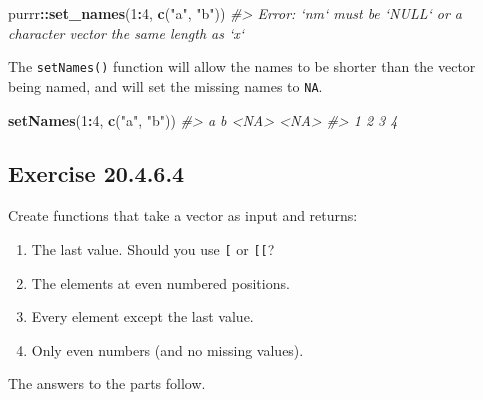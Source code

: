 \documentclass[]{book}
\newenvironment{Shaded}{\begin{snugshade}}{\end{snugshade}}
\newcommand{\CommentTok}[1]{\textcolor[rgb]{0.56,0.35,0.01}{\textit{#1}}}
\newcommand{\DecValTok}[1]{\textcolor[rgb]{0.00,0.00,0.81}{#1}}
\newcommand{\KeywordTok}[1]{\textcolor[rgb]{0.13,0.29,0.53}{\textbf{#1}}}
\newcommand{\NormalTok}[1]{#1}
\newcommand{\OperatorTok}[1]{\textcolor[rgb]{0.81,0.36,0.00}{\textbf{#1}}}
\newcommand{\StringTok}[1]{\textcolor[rgb]{0.31,0.60,0.02}{#1}}
\providecommand{\tightlist}{%
  \setlength{\itemsep}{0pt}\setlength{\parskip}{0pt}}
\theoremstyle{plain}
\theoremstyle{remark}
\begin{document}
\begin{Shaded}
\begin{Highlighting}[]
\NormalTok{purrr}\OperatorTok{::}\KeywordTok{set_names}\NormalTok{(}\DecValTok{1}\OperatorTok{:}\DecValTok{4}\NormalTok{, }\KeywordTok{c}\NormalTok{(}\StringTok{"a"}\NormalTok{, }\StringTok{"b"}\NormalTok{))}
\CommentTok{#> Error: `nm` must be `NULL` or a character vector the same length as `x`}
\end{Highlighting}
\end{Shaded}

The \texttt{setNames()} function will allow the names to be shorter than
the vector being named, and will set the missing names to \texttt{NA}.

\begin{Shaded}
\begin{Highlighting}[]
\KeywordTok{setNames}\NormalTok{(}\DecValTok{1}\OperatorTok{:}\DecValTok{4}\NormalTok{, }\KeywordTok{c}\NormalTok{(}\StringTok{"a"}\NormalTok{, }\StringTok{"b"}\NormalTok{))}
\CommentTok{#>    a    b <NA> <NA> }
\CommentTok{#>    1    2    3    4}
\end{Highlighting}
\end{Shaded}

\hypertarget{exercise-20.4.6.4}{%
\subsection*{\texorpdfstring{Exercise
{20.4.6.4}}{Exercise 20.4.6.4}}\label{exercise-20.4.6.4}}

Create functions that take a vector as input and returns:

\begin{enumerate}
\def\labelenumi{\arabic{enumi}.}
\tightlist
\item
  The last value. Should you use \texttt{{[}} or \texttt{{[}{[}}?
\item
  The elements at even numbered positions.
\item
  Every element except the last value.
\item
  Only even numbers (and no missing values).
\end{enumerate}

The answers to the parts follow.
\end{document}
